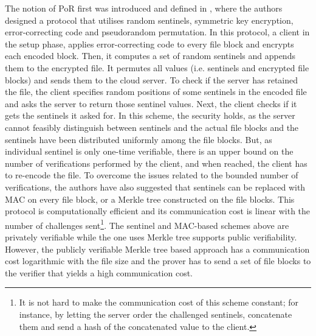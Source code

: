 The notion of PoR first was introduced and defined in \cite{DBLP:conf/ccs/JuelsK07}, where the authors designed a protocol that utilises  random sentinels, symmetric key encryption,  error-correcting code and pseudorandom permutation. In this protocol, a client in the setup phase, applies error-correcting code to every file block and encrypts each encoded block. Then, it computes a set of random sentinels and appends them to the encrypted file. It  permutes all values (i.e. sentinels and encrypted file blocks) and sends them to the cloud  server.  To check if  the server has retained the file, the client specifies  random positions of some sentinels in the encoded file and asks
the server to return those sentinel values. Next, the client checks if it gets the sentinels it asked for. In this scheme, the security holds, as the server cannot feasibly distinguish between sentinels and the actual file blocks and the sentinels have been distributed uniformly among the file blocks. But, as individual sentinel is only one-time verifiable, there is an upper bound on the number of verifications performed by the client, and when reached, the client has to re-encode the file.  To overcome the issues related to the bounded number of verifications, the authors have also suggested that sentinels can be replaced with  MAC on every file block, or a Merkle tree constructed on the file blocks. This protocol is computationally efficient and its communication cost is linear with the number of challenges sent\footnote{It is not hard to make the communication cost of this scheme constant; for instance, by letting the server order the challenged sentinels, concatenate them and send a hash of the concatenated value to the client.}. The sentinel and MAC-based schemes above are privately verifiable while the one uses Merkle tree supports public verifiability. However, the publicly verifiable Merkle tree based approach has a communication cost logarithmic with the file size and the prover has to send a set of file blocks to the verifier that yields a high communication cost. 


